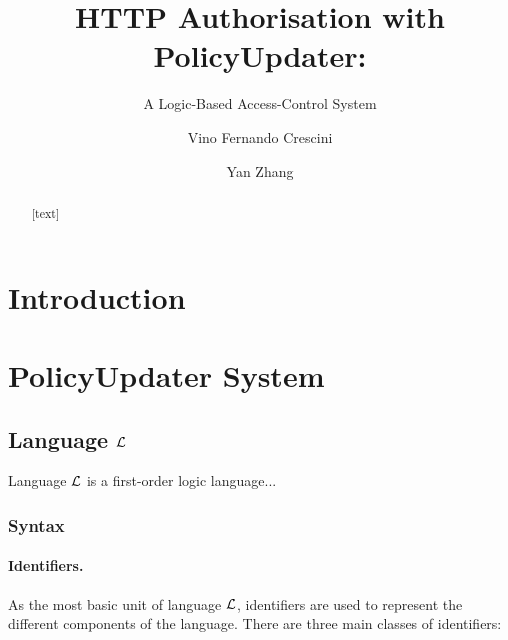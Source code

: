 \documentclass{llncs}
\begin{document}
  \title{HTTP Authorisation with PolicyUpdater:}
  \subtitle{A Logic-Based Access-Control System}

  \author{Vino Fernando Crescini \and Yan Zhang}


  \maketitle

  \begin{abstract}
    [text]
  \end{abstract}

  \section{Introduction}

  \section{PolicyUpdater System}

    \subsection{Language ${\cal L}$}

      Language ${\cal L}$ is a first-order logic language...

      \subsubsection{Syntax}

        \paragraph{\bf Identifiers.}
          As the most basic unit of language ${\cal L}$,
          identifiers are used to represent the different components of the
          language. There are three main classes of identifiers:
\end{document}
